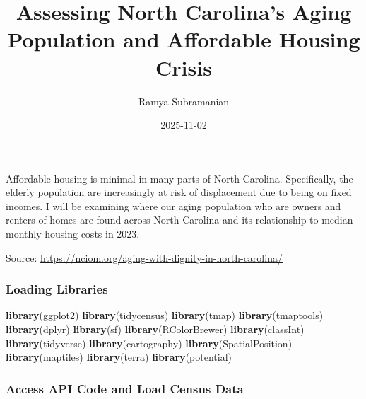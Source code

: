 \documentclass[
]{article}
\title{Assessing North Carolina's Aging Population and Affordable
Housing Crisis}
\author{Ramya Subramanian}
\date{2025-11-02}
\newenvironment{Shaded}{\begin{snugshade}}{\end{snugshade}}
\newcommand{\AttributeTok}[1]{\textcolor[rgb]{0.13,0.29,0.53}{#1}}
\newcommand{\ConstantTok}[1]{\textcolor[rgb]{0.56,0.35,0.01}{#1}}
\newcommand{\FunctionTok}[1]{\textcolor[rgb]{0.13,0.29,0.53}{\textbf{#1}}}
\newcommand{\NormalTok}[1]{#1}
\newcommand{\SpecialCharTok}[1]{\textcolor[rgb]{0.81,0.36,0.00}{\textbf{#1}}}
\begin{document}
\maketitle

\begin{Shaded}
\end{Shaded}

Affordable housing is minimal in many parts of North Carolina.
Specifically, the elderly population are increasingly at risk of
displacement due to being on fixed incomes. I will be examining where
our aging population who are owners and renters of homes are found
across North Carolina and its relationship to median monthly housing
costs in 2023.

Source: \url{https://nciom.org/aging-with-dignity-in-north-carolina/}

\subsubsection{Loading Libraries}\label{loading-libraries}

\begin{Shaded}
\begin{Highlighting}[]
\FunctionTok{library}\NormalTok{(ggplot2)}
\FunctionTok{library}\NormalTok{(tidycensus)}
\FunctionTok{library}\NormalTok{(tmap)}
\FunctionTok{library}\NormalTok{(tmaptools)}
\FunctionTok{library}\NormalTok{(dplyr)        }
\FunctionTok{library}\NormalTok{(sf)      }
\FunctionTok{library}\NormalTok{(RColorBrewer)}
\FunctionTok{library}\NormalTok{(classInt)     }
\FunctionTok{library}\NormalTok{(tidyverse)        }
\FunctionTok{library}\NormalTok{(cartography) }
\FunctionTok{library}\NormalTok{(SpatialPosition)}
\FunctionTok{library}\NormalTok{(maptiles) }
\FunctionTok{library}\NormalTok{(terra)}
\FunctionTok{library}\NormalTok{(potential)}
\end{Highlighting}
\end{Shaded}

\subsubsection{Access API Code and Load Census
Data}\label{access-api-code-and-load-census-data}
\end{document}
